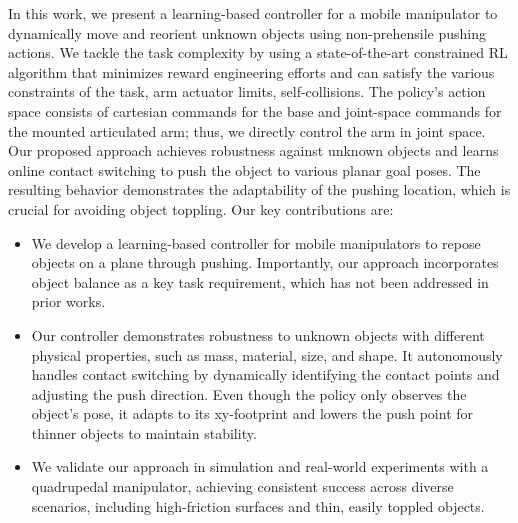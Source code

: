In this work, we present a learning-based controller for a mobile manipulator to dynamically move and reorient unknown objects using non-prehensile pushing actions. We tackle the task complexity by using a state-of-the-art constrained RL algorithm \cite{chanesane2024cat} that minimizes reward engineering efforts and can satisfy the various constraints of the task, \eg arm actuator limits, self-collisions. The policy's action space consists of cartesian commands for the base and joint-space commands for the mounted articulated arm; thus, we directly control the arm in joint space. Our proposed approach achieves robustness against unknown objects and learns online contact switching to push the object to various planar goal poses. The resulting behavior demonstrates the adaptability of the pushing location, which is crucial for avoiding object toppling. Our key contributions are:
\begin{itemize}
    \item We develop a learning-based controller for mobile manipulators to repose objects on a plane through pushing. Importantly, our approach incorporates object balance as a key task requirement, which has not been addressed in prior works.
    \item Our controller demonstrates robustness to unknown objects with different physical properties, such as mass, material, size, and shape. It autonomously handles contact switching by dynamically identifying the contact points and adjusting the push direction. Even though the policy only observes the object's pose, it adapts to its xy-footprint and lowers the push point for thinner objects to maintain stability. 
    \item We validate our approach in simulation and real-world experiments with a quadrupedal manipulator, achieving consistent success across diverse scenarios, including high-friction surfaces and thin, easily toppled objects.
\end{itemize}
